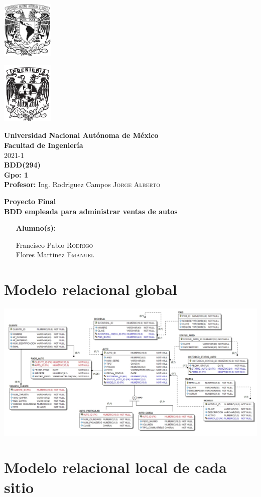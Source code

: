 \documentclass{article}
\newcommand{\coverPage}{
\thispagestyle{empty}
  \begin{minipage}[t][5cm][t]{0.2\linewidth}
    \includegraphics[width=2.5cm]{unam.jpg}

    \vspace{10cm}

    \includegraphics[width=2.5cm]{fiblack}
  \end{minipage}
  \begin{minipage}[t]{0.7\linewidth}
    \vspace{-2.5cm}
    \LARGE{\textbf{\university}}\\
    \Large{\textbf{\faculty}} \\
  
    \large{\semestre}\\[2cm]
  
    \large{\textbf{\materia (\clave)}}\\
    \large{\textbf{Gpo: \grupo}}\\[5mm]
    \large{\textbf{Profesor:} \profesor}\\ [1.5cm]
    \begin{center}
        \LARGE{\textbf{\actividad}}\\
        \LARGE{\textbf{\titulo}}\\
    \end{center}
  
    \vspace{3.3cm}
  
    \large{
      \begin{itemize}[ noitemsep, align=left ]
        \item [\textbf{Alumno(s):}] 
          \begin{flushright}
            \alumno
          \end{flushright}
      \end{itemize}
    } \vspace{1.5cm}
  
    \begin{flushright}
        \fechaEntrega%
    \end{flushright}
  \end{minipage}

\newpage
}
\begin{document}

\newcommand{\university}{Universidad Nacional Autónoma de México}
\newcommand{\faculty}{Facultad de Ingeniería}
\newcommand{\semestre}{2021-1}
\newcommand{\materia}{BDD}
\newcommand{\clave}{294}
\newcommand{\grupo}{1}
\newcommand{\profesor}{Ing. Rodriguez Campos \textsc{Jorge Alberto}}

\newcommand{\alumno}{
  Francisco Pablo \textsc{Rodrigo} \\ 
  Flores Martinez \textsc{Emanuel}   
}
\newcommand{\actividad}{Proyecto Final}
\newcommand{\titulo}{BDD empleada para administrar ventas de autos}

\newcommand{\fechaEntrega}{}

\newcommand{\codedir}{codigo}
\graphicspath{{assets/}{bdd_proyecto.assets/}{modelo}}

\coverPage%



\section*{Modelo relacional global}

\includegraphics[width=\linewidth]{modelo}\\

\section*{Modelo relacional local de cada sitio}
\end{document}
